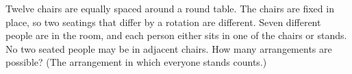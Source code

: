 Twelve chairs are equally spaced around a round table. The chairs are fixed in place, so two seatings that differ by a rotation are different. Seven different people are in the room, and each person either sits in one of the chairs or stands. No two seated people may be in adjacent chairs. How many arrangements are possible? (The arrangement in which everyone stands counts.)
